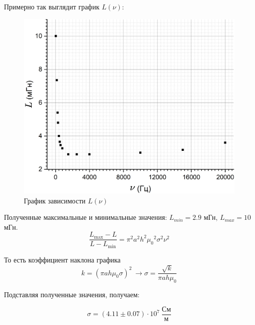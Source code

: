 \documentclass[a4paper, 12pt]{article}
\begin{document}
	Примерно так выглядит график $L(\nu)$:
	
	\begin{figure}[H]
		\centering
		\includegraphics[width = \textwidth]{L(nu)}
		\caption{График зависимости $L(\nu)$}
	\end{figure}
	
	Полученные максимальные и минимальные значения: $L_{min} = 2.9$ мГн, $L_{max} = 10$ мГн.
	\begin{equation*}
		\frac{L_{\max} - L}{L - L_{\min}} = \pi ^2 a^2 h^2 {\mu_0}^2 \sigma^2 \nu^2
	\end{equation*}
	
	То есть коэффициент наклона графика
	\[k = (\pi ah\mu_0 \sigma)^2 \ \rightarrow \sigma = \frac{\sqrt{k}}{\pi ah \mu_0}\]
	
	Подставляя полученные значения, получаем:
	
	\begin{equation}
		\sigma = (4.11 \pm 0.07) \cdot 10^7  \ \frac{\text{См}}{\text{м}}
	\end{equation}
	
\end{document}
